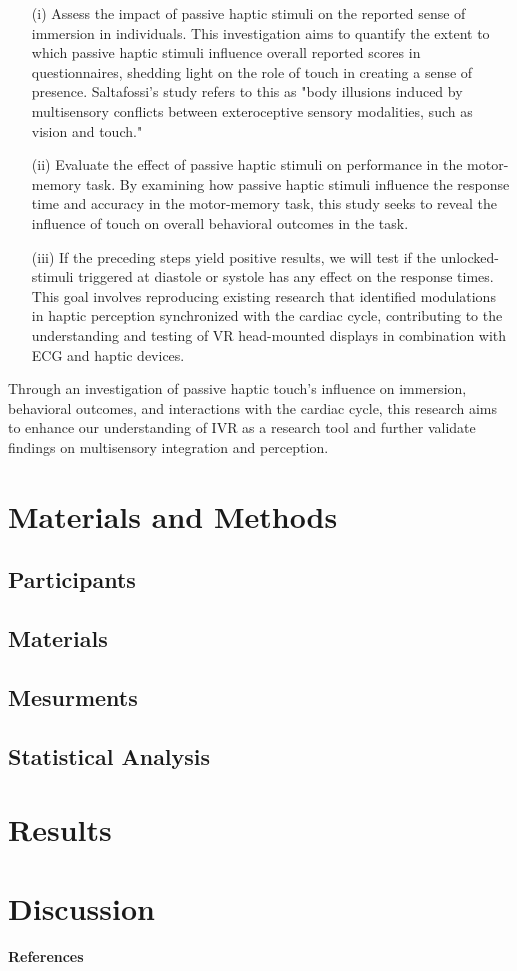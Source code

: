 \documentclass[12pt,oneside,openright]{report}
\begin{document}
\begin{itemize}
  \item[(i)] Assess the impact of passive haptic stimuli on the reported sense of immersion in individuals. This investigation aims to quantify the extent to which passive haptic stimuli influence overall reported scores in questionnaires, shedding light on the role of touch in creating a sense of presence. Saltafossi's study refers to this as "body illusions induced by multisensory conflicts between exteroceptive sensory modalities, such as vision and touch."
    
  \item[(ii)] Evaluate the effect of passive haptic stimuli on performance in the motor-memory task. By examining how passive haptic stimuli influence the response time and accuracy in the motor-memory task, this study seeks to reveal the influence of touch on overall behavioral outcomes in the task.  
    
  \item[(iii)] If the preceding steps yield positive results, we will test if the unlocked-stimuli triggered at diastole or systole has any effect on the response times. This goal involves reproducing existing research that identified modulations in haptic perception synchronized with the cardiac cycle, contributing to the understanding and testing of VR head-mounted displays in combination with ECG and haptic devices.
\end{itemize}

Through an investigation of passive haptic touch's influence on immersion, behavioral outcomes, and interactions with the cardiac cycle, this research aims to enhance our understanding of IVR as a research tool and further validate findings on multisensory integration and perception.


\section*{Materials and Methods}
    \subsection*{Participants}
    \subsection*{Materials}
    \subsection*{Mesurments}
    \subsection*{Statistical Analysis}
\section*{Results}
\section*{Discussion}


\pagebreak

\paragraph{\textbf{References}}
\printbibliography[heading=none]
\end{document}
